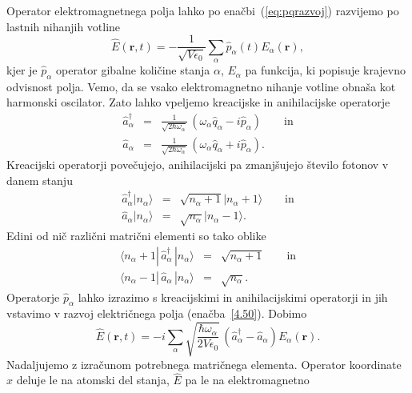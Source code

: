 Operator elektromagnetnega polja lahko po enačbi~(\ref{eq:pqrazvoj}) 
razvijemo po lastnih nihanjih votline 
\begin{equation}
\hat{E}(\mathbf{r},t)=-\frac{1}{\sqrt{V\epsilon_{0}}}\sum_{\alpha}
\hat{p}_{\alpha}(t)E_{\alpha}(\mathbf{r}),
\label{4.50}
\end{equation}
kjer je $\hat{p}_{\alpha}$ operator gibalne količine stanja $\alpha$, $E_{\alpha}$
pa funkcija, ki popisuje krajevno odvisnost polja. Vemo, da se vsako 
elektromagnetno nihanje votline obnaša kot harmonski oscilator.
Zato lahko vpeljemo kreacijske in anihilacijske operatorje
\begin{eqnarray}
\hat{a}_{\alpha}^{\dagger} & = & \frac{1}{\sqrt{2\hbar\omega_{\alpha}}}\,
(\omega_{\alpha}\hat{q}_{\alpha}-i\hat{p}_{\alpha}) \qquad \mathrm{in} \\
\hat{a}_{\alpha} & = & \frac{1}{\sqrt{2\hbar\omega_{\alpha}}}\,(\omega_{\alpha}\hat{q}_{\alpha}+i\hat{p}_{\alpha}).
\end{eqnarray}
 Kreacijski operatorji povečujejo, anihilacijski pa zmanjšujejo število
fotonov v danem stanju
\begin{eqnarray}
\hat{a}_{\alpha}^{\dagger}|n_{\alpha}\rangle & = & \sqrt{n_{\alpha}+1}
|n_{\alpha}+1\rangle\qquad \mathrm{in} \\
\hat{a}_{\alpha}|n_{\alpha}\rangle & = & \sqrt{n_{\alpha}}|n_{\alpha}-1\rangle.
\end{eqnarray}
Edini od nič različni matrični elementi so tako oblike
\begin{eqnarray}
\langle n_\alpha +1|\, \hat{a}_{\alpha}^{\dagger}\,|n_{\alpha}\rangle & = 
& \sqrt{n_{\alpha}+1} \qquad \mathrm{in} \label{eq:ankr.1}\\
\langle n_\alpha-1|\,\hat{a}_{\alpha}\,|n_{\alpha}\rangle & = & \sqrt{n_{\alpha}}.
\label{eq:ankr}
\end{eqnarray}
Operatorje $\hat{p}_{\alpha}$ lahko izrazimo s kreacijskimi in anihilacijskimi
operatorji in jih vstavimo v razvoj električnega polja (enačba~\ref{4.50}). Dobimo
\begin{equation}
\hat{E}(\mathbf{r},t)=-i\sum_{\alpha}\sqrt{\frac{\hbar\omega_{\alpha}}{2V\epsilon_{0}}}\,
\left(\hat{a}_{\alpha}^{\dagger}-\hat{a}_{\alpha}\right)E_{\alpha}(\mathbf{r}).
\label{4.53}
\end{equation}
Nadaljujemo z izračunom potrebnega matričnega elementa. Operator koordinate
$\hat{x}$ deluje le na atomski del stanja, $\hat{E}$ pa le na elektromagnetno
